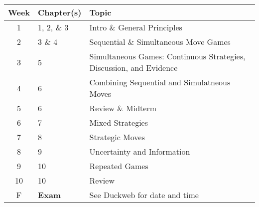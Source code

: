 \begin{table}[!ht]
    \centering
    \begin{tabular}{c|l|l}
            Week & Chapter(s) & Topic \\ \hline \hline
        1 & 1, 2, \& 3 & Intro \& General Principles \\ 
        2 & 3 \& 4 & Sequential \& Simultaneous Move Games \\ 
        3 & 5 & Simultaneous Games: Continuous Strategies, Discussion, and Evidence \\ 
        4 & 6 & Combining Sequential and Simulatneous Moves \\ 
        5 & 6 & Review \& Midterm \\ 
        6 & 7 & Mixed Strategies \\ 
        7 & 8 & Strategic Moves \\ 
        8 & 9 & Uncertainty and Information \\ 
        9 & 10 & Repeated Games \\
        10 & 10 & Review \\ \hline
        F & \textbf{Exam} & See Duckweb for date and time \\ 
    \end{tabular}
\end{table}
